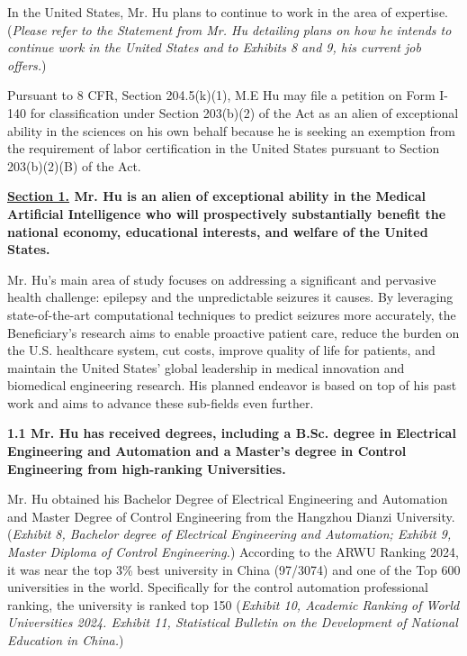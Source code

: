 \documentclass{article}
\begin{document}
In the United States, Mr. Hu plans to continue to work in the area of expertise. ({\it Please refer to the Statement from Mr. Hu detailing plans on how he intends to continue work in the United States and to Exhibits 8 and 9, his current job offers.})

Pursuant to 8 CFR, Section 204.5(k)(1), M.E Hu may file a petition on Form I-140 for classification under Section 203(b)(2) of the Act as an alien of exceptional ability in the sciences on his own behalf because he is seeking an exemption from the requirement of labor certification in the United States pursuant to Section 203(b)(2)(B) of the Act.

\clearpage

{\bf \underline{Section 1.} Mr. Hu is an alien of exceptional ability in the Medical Artificial Intelligence who will prospectively substantially benefit the national economy, educational interests, and welfare of the United States.}

Mr. Hu's main area of study focuses on addressing a significant and pervasive health challenge: epilepsy and the unpredictable seizures it causes. By leveraging state-of-the-art computational techniques to predict seizures more accurately, the Beneficiary's research aims to enable proactive patient care, reduce the burden on the U.S. healthcare system, cut costs, improve quality of life for patients, and maintain the United States’ global leadership in medical innovation and biomedical engineering research. His planned endeavor is based on top of his past work and aims to advance these sub-fields even further.

 
{\bf 1.1 Mr. Hu has received degrees, including a B.Sc. degree in Electrical Engineering and Automation and a Master’s degree in Control Engineering  from high-ranking Universities. }

Mr. Hu obtained his Bachelor Degree of Electrical Engineering and Automation and Master Degree of Control Engineering from the Hangzhou Dianzi University. ({\it Exhibit 8, Bachelor degree of Electrical Engineering and Automation; Exhibit 9, Master Diploma of Control Engineering.}) According to the ARWU Ranking 2024, it was near the top 3\%  best university in China (97/3074) and one of the Top 600 universities in the world. Specifically for the control automation professional ranking, the university is ranked top 150 ({\it Exhibit 10, Academic Ranking of World Universities 2024. Exhibit 11, Statistical Bulletin on the Development of National Education in China.}) 
\end{document}
